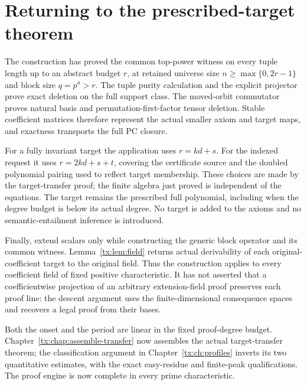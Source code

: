 \section*{Returning to the prescribed-target theorem}
The construction has proved the common top-power witness on every
tuple length up to an abstract budget $r$, at retained universe size
$n\ge\max\{0,2r-1\}$ and block size $q=p^a>r$. The tuple purity
calculation and the explicit projector prove exact deletion on the
full support class. The moved-orbit commutator proves natural basis
and permutation-first-factor tensor deletion. Stable coefficient
matrices therefore represent the actual smaller axiom and target
maps, and exactness transports the full PC closure.

For a fully invariant target the application uses $r=kd+s$. For
the indexed request it uses $r=2kd+s+t$, covering the certificate
source and the doubled polynomial pairing used to reflect target
membership. These choices are made by the target-transfer proof;
the finite algebra just proved is independent of the equations.
The target remains the prescribed full polynomial, including when
the degree budget is below its actual degree. No target is added
to the axioms and no semantic-entailment inference is introduced.

Finally, extend scalars only while constructing the generic block
operator and its common witness. Lemma~\ref{tx:lem:field} returns
actual derivability of each original-coefficient target to the original
field. Thus the construction applies to every coefficient field of
fixed positive characteristic. It has not asserted that a coefficientwise
projection of an arbitrary extension-field proof preserves each proof
line: the descent argument uses the finite-dimensional consequence
spaces and recovers a legal proof from their bases.

Both the onset and the period are linear in the fixed proof-degree
budget. Chapter~\ref{tx:chap:assemble-transfer} now assembles the actual
target-transfer theorem; the classification argument in
Chapter~\ref{tx:ch:profiles} inverts its two quantitative estimates,
with the exact easy-residue and finite-peak qualifications. The proof
engine is now complete in every prime characteristic.
